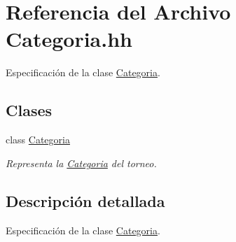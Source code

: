 \hypertarget{_categoria_8hh}{}\section{Referencia del Archivo Categoria.\+hh}
\label{_categoria_8hh}


Especificación de la clase \mbox{\hyperlink{class_categoria}{Categoria}}.  


\subsection*{Clases}
\begin{DoxyCompactItemize}
\item 
class \mbox{\hyperlink{class_categoria}{Categoria}}
\begin{DoxyCompactList}\small\item\em Representa la \mbox{\hyperlink{class_categoria}{Categoria}} del torneo. \end{DoxyCompactList}\end{DoxyCompactItemize}


\subsection{Descripción detallada}
Especificación de la clase \mbox{\hyperlink{class_categoria}{Categoria}}. 

